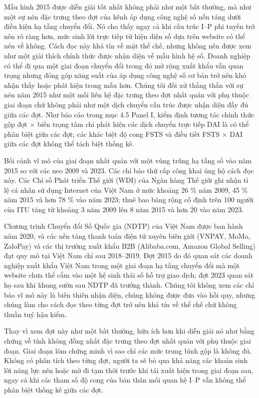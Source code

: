 \documentclass[12pt,a4paper]{article}
\begin{document}
Mẫu hình 2015 được diễn giải tốt nhất không phải như một bất thường, mà
như một sự nén đặc trưng theo đợt của kênh áp dụng công nghệ số nền tảng
dưới điều kiện hạ tầng chuyển đổi. Nó cho thấy ngay cả khi cấu trúc I--P
phi tuyến trở nên rõ ràng hơn, mức sinh lời trực tiếp từ hiện diện số
dựa trên website có thể nén về không. Cách đọc này khả tín về mặt thể
chế, nhưng không nên được xem như một giải thích chính thức được nhận
diện về mẫu hình hệ số. Doanh nghiệp có thể đi qua một giai đoạn chuyển
đổi trong đó mở rộng xuất khẩu vẫn quan trọng nhưng đóng góp năng suất
của áp dụng công nghệ số cơ bản trở nên khó nhận thấy hoặc phát hiện
trong mẫu hơn. Chúng tôi đối xử thẳng thắn với sự nén năm 2015 như một
mối liên hệ đặc trưng theo đợt nhất quán với phụ thuộc giai đoạn chứ
không phải như một dịch chuyển cấu trúc được nhận diện đầy đủ giữa các
đợt. Như báo cáo trong mục 4.5 Panel I, kiểm định tương tác chính thức
gộp đợt × biến trọng tâm chỉ phát hiện các dịch chuyển trực tiếp DAI là
có thể phân biệt giữa các đợt; các khác biệt độ cong FSTS và điều tiết
FSTS × DAI giữa các đợt không thể tách biệt thống kê.

Bối cảnh vĩ mô của giai đoạn nhất quán với một vùng trũng hạ tầng số vào
năm 2015 so với các neo 2009 và 2023. Các chỉ báo thứ cấp công khai ủng
hộ cách đọc này. Các Chỉ số Phát triển Thế giới (WDI) của Ngân hàng Thế
giới ghi nhận tỉ lệ cá nhân sử dụng Internet của Việt Nam ở mức khoảng
26 \% năm 2009, 45 \% năm 2015 và hơn 78 \% vào năm 2023; thuê bao băng
rộng cố định trên 100 người của ITU tăng từ khoảng 3 năm 2009 lên 8 năm
2015 và hơn 20 vào năm 2023.

Chương trình Chuyển đổi Số Quốc gia (NDTP) của Việt Nam được ban hành
năm 2020, và các nền tảng thanh toán điện tử xuyên biên giới (VNPAY,
MoMo, ZaloPay) và các thị trường xuất khẩu B2B (Alibaba.com, Amazon
Global Selling) đạt quy mô tại Việt Nam chỉ sau 2018--2019. Đợt 2015 do
đó quan sát các doanh nghiệp xuất khẩu Việt Nam trong một giai đoạn hạ
tầng chuyển đổi mà một website chưa thể cắm vào một hệ sinh thái số hỗ
trợ giao dịch; đợt 2023 quan sát họ sau khi khung sườn sau NDTP đã
trưởng thành. Chúng tôi không xem các chỉ báo vĩ mô này là biến thiên
nhận diện, chúng không được đưa vào hồi quy, nhưng chúng làm cho cách
đọc theo từng đợt trở nên khả tín về thể chế chứ không thuần tuý hậu
kiểm.

Thay vì xem đợt này như một bất thường, hữu ích hơn khi diễn giải nó như
bằng chứng về tính không đồng nhất đặc trưng theo đợt nhất quán với phụ
thuộc giai đoạn. Giai đoạn lõm chứng minh vì sao chỉ các mức trung bình
gộp là không đủ. Không có phân tích theo từng đợt, người ta sẽ bỏ qua
khả năng các khoản sinh lời năng lực nén hoặc mờ đi tạm thời trước khi
tái xuất hiện trong giai đoạn sau, ngay cả khi các tham số độ cong của
bản thân mối quan hệ I--P vẫn không thể phân biệt thống kê giữa các đợt.
\end{document}
